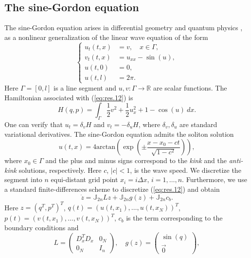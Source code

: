 \subsection{The sine-Gordon equation} \label{sec:res.2}
The sine-Gordon equation arises in differential geometry and quantum physics \cite{Misumi2015}, as a nonlinear generalization of the linear wave equation of the form
\begin{equation} \label{eq:res.12}
\left\{
\begin{aligned}
	u_{t}(t,x) &= v, \quad x\in \Gamma,\\
	v_t(t,x) &= u_{xx} - \sin(u), \\
	u(t,0) &= 0, \\
	u(t,l) &= 2\pi.
\end{aligned}
\right.
\end{equation}
Here $\Gamma = [0,l]$ is a line segment and $u,v: \Gamma \to \mathbb R$ are scalar functions. The Hamiltonian associated with (\ref{eq:res.12}) is
\begin{equation} \label{eq:res.13}
	H(q,p) = \int_{\Gamma} \frac 1 2 v^2 + \frac 1 2 u_x^2 + 1 - \cos(u) \ dx.
\end{equation}
One can verify that $u_{t} = \delta_v H$ and $v_{t} = - \delta_u H$, where $\delta_v,\delta_u$ are standard variational derivatives. The sine-Gordon equation admits the soliton solution \cite{Misumi2015}
\begin{equation} \label{eq:res.14}
	u(t,x) = 4 \text{arctan}\left( \exp \left( \pm \frac{x - x_0 - ct}{\sqrt{1-c^2}} \right) \right),
\end{equation}
where $x_0 \in \Gamma$ and the plus and minus signs correspond to the \emph{kink} and the \emph{anti-kink} solutions, respectively. Here $c$, $|c|<1$, is the wave speed. We discretize the segment into $n$ equi-distant grid point $x_i = i\Delta x$, $i=1,\dots,n$. Furthermore, we use a standard finite-differences scheme to discretize (\ref{eq:res.12}) and obtain
\begin{equation} \label{eq:res.15}
	\dot z = \mathbb J_{2n} L z + \mathbb J_{2n} g(z) + \mathbb J_{2n} c_b.
\end{equation}
Here $z = (q^T,p^T)^T$, $q(t) = (u(t,x_1),\dots,u(t,x_N))^T$, $p(t) = (v(t,x_1),\dots,v(t,x_N))^T$, $c_b$ is the term corresponding to the boundary conditions and
\begin{equation} \label{eq:res.16}
	L = 
	\begin{pmatrix}
		D_x^TD_x & 0_N \\
		0_N & I_n
	\end{pmatrix}, 
	\quad
	g(z) = 
	\begin{pmatrix}
	\sin(q) \\
	\vec 0
	\end{pmatrix},
\end{equation}
